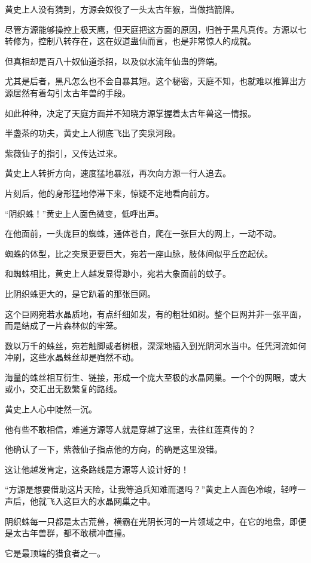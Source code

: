 \begin{this_body}
黄史上人没有猜到，方源会奴役了一头太古年猴，当做挡箭牌。

尽管方源能够操控上极天鹰，但天庭把这方面的原因，归咎于黑凡真传。方源以七转修为，控制八转存在，这在奴道蛊仙而言，也是非常惊人的成就。

但真相却是百八十奴仙道杀招，以及似水流年仙蛊的弊端。

尤其是后者，黑凡怎么也不会自暴其短。这个秘密，天庭不知，也就难以推算出方源居然有着勾引太古年兽的手段。

如此种种，决定了天庭方面并不知晓方源掌握着太古年兽这一情报。

半盏茶的功夫，黄史上人彻底飞出了突泉河段。

紫薇仙子的指引，又传达过来。

黄史上人转折方向，速度猛地暴涨，再次向方源一行人追去。

片刻后，他的身形猛地停滞下来，惊疑不定地看向前方。

“阴织蛛！”黄史上人面色微变，低呼出声。

在他面前，一头庞巨的蜘蛛，通体苍白，爬在一张巨大的网上，一动不动。

蜘蛛的体型，比之突泉更要巨大，宛若一座山脉，肢体间似乎丘峦起伏。

和蜘蛛相比，黄史上人越发显得渺小，宛若大象面前的蚊子。

比阴织蛛更大的，是它趴着的那张巨网。

这个巨网宛若水晶质地，有点纤细如发，有的粗壮如树。整个巨网并非一张平面，而是结成了一片森林似的牢笼。

数以万千的蛛丝，宛若触脚或者树根，深深地插入到光阴河水当中。任凭河流如何冲刷，这些水晶蛛丝却是岿然不动。

海量的蛛丝相互衍生、链接，形成一个庞大至极的水晶网巢。一个个的网眼，或大或小，交汇出无数繁复的路线。

黄史上人心中陡然一沉。

他有些不敢相信，难道方源等人就是穿越了这里，去往红莲真传的？

他确认了一下，紫薇仙子指点他的方向，的确是这里没错。

这让他越发肯定，这条路线是方源等人设计好的！

“方源是想要借助这片天险，让我等追兵知难而退吗？”黄史上人面色冷峻，轻哼一声后，他就飞入这巨大的水晶网巢之中。

阴织蛛每一只都是太古荒兽，横霸在光阴长河的一片领域之中，在它的地盘，即便是太古年兽群，都不敢横冲直撞。

它是最顶端的猎食者之一。


\end{this_body}
